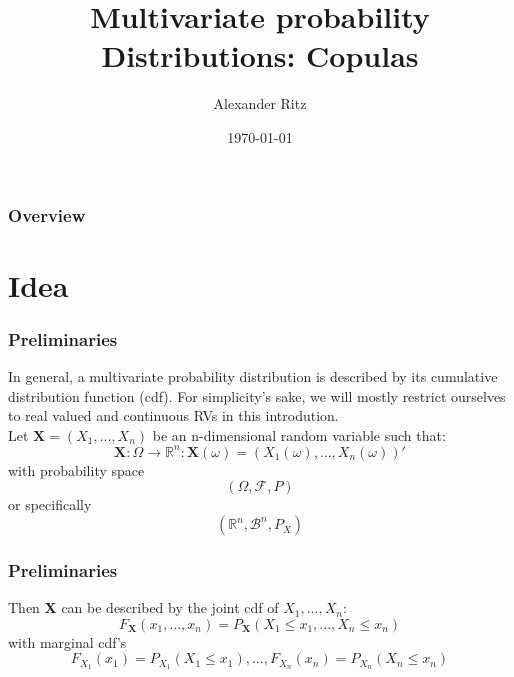 \documentclass{beamer}
\title[Copulas]{Multivariate probability Distributions: Copulas} %
\author{Alexander Ritz} %
\institute[University of Göttingen] %
{
University of Göttingen \\ %
\medskip

}
\date{\today} %
\begin{document}
\begin{frame}
\titlepage %
\end{frame}

\begin{frame}
\frametitle{Overview} %
\tableofcontents %
\end{frame}



\section{Idea} 
\frame{\sectionpage}

\begin{frame}
\frametitle{Preliminaries}

In general, a multivariate probability distribution is described by its cumulative distribution function (cdf). For simplicity's sake, we will mostly restrict ourselves to real valued and continuous RVs in this introdution.\\
Let $\textbf{X} = (X_1, ..., X_n) $ be an n-dimensional random variable such that:
\[\textbf{X}: \Omega \rightarrow \mathbb{R}^n : \textbf{X}(\omega)=(X_1(\omega),..., X_n(\omega))'\]
with probability space
\[(\Omega, \mathcal{F}, P)\] or specifically \[(\mathbb{R}^n, \mathcal{B}^n, P_X)\]

\end{frame}


\begin{frame}
\frametitle{Preliminaries}

Then \textbf{X} can be described by the joint cdf of $X_1, ..., X_n$:
\[F_{\textbf{X}}(x_1, ..., x_n)= P_{\textbf{X}}(X_1 \leq x_1, ..., X_n \leq x_n)\]
with marginal cdf's
\[F_{X_1}(x_1) = P_{X_1}(X_1 \leq x_1), ..., F_{X_n}(x_n)=P_{X_n}(X_n \leq x_n)\]
\end{frame}
\end{document}
